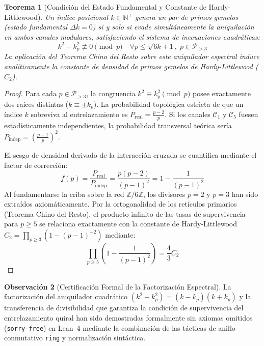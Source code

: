 \documentclass{article}
\numberwithin{equation}{section}
\theoremstyle{plain}
\newtheorem{theorem}{Teorema}[section]
\theoremstyle{definition}
\newtheorem{remark}[theorem]{Observación}
\begin{document}
\begin{theorem}[Condición del Estado Fundamental y Constante de Hardy-Littlewood]
\label{thm:hardy-littlewood-kmin}
Un índice posicional $k \in \mathbb{N}^+$ genera un par de primos gemelos (estado fundamental $\Delta k = 0$) si y solo si evade simultáneamente la aniquilación en ambos canales modulares, satisfaciendo el sistema de inecuaciones cuadráticas:
\begin{equation}
k^2 - k_p^2 \not\equiv 0 \pmod p \quad \forall p \le \sqrt{6k+1}, \; p \in \mathcal{P}_{>3}
\end{equation}
La aplicación del Teorema Chino del Resto sobre este aniquilador espectral induce analíticamente la constante de densidad de primos gemelos de Hardy-Littlewood ($C_2$).
\end{theorem}

\begin{proof}
Para cada $p \in \mathcal{P}_{>3}$, la congruencia $k^2 \equiv k_p^2 \pmod p$ posee exactamente dos raíces distintas ($k \equiv \pm k_p$). La probabilidad topológica estricta de que un índice $k$ sobreviva al entrelazamiento es $P_{\text{real}} = \frac{p-2}{p}$. Si los canales $\mathcal{C}_1$ y $\mathcal{C}_5$ fuesen estadísticamente independientes, la probabilidad transversal teórica sería $P_{\text{indep}} = \left(\frac{p-1}{p}\right)^2$.

El sesgo de densidad derivado de la interacción cruzada se cuantifica mediante el factor de corrección:
\begin{equation}
f(p) = \frac{P_{\text{real}}}{P_{\text{indep}}} = \frac{p(p-2)}{(p-1)^2} = 1 - \frac{1}{(p-1)^2}
\end{equation}
Al fundamentarse la criba sobre la red $\mathbb{Z}/6\mathbb{Z}$, los divisores $p=2$ y $p=3$ han sido extraídos axiomáticamente. Por la ortogonalidad de los retículos primarios (Teorema Chino del Resto), el producto infinito de las tasas de supervivencia para $p \ge 5$ se relaciona exactamente con la constante de Hardy-Littlewood $C_2 = \prod_{p \ge 3} (1 - (p-1)^{-2})$ mediante:
\begin{equation}
\prod_{p \ge 5} \left( 1 - \frac{1}{(p-1)^2} \right) = \frac{4}{3} C_2
\end{equation}
\end{proof}

\begin{remark}[Certificación Formal de la Factorización Espectral]
\label{rem:certificacion-hardy-littlewood}
La factorización del aniquilador cuadrático $(k^2 - k_p^2) = (k - k_p)(k + k_p)$ y la transferencia de divisibilidad que garantiza la condición de supervivencia del entrelazamiento quiral han sido demostradas formalmente sin axiomas omitidos (\texttt{sorry-free}) en Lean~4 mediante la combinación de las tácticas de anillo conmutativo \texttt{ring} y normalización sintáctica.
\end{remark}
\end{document}
